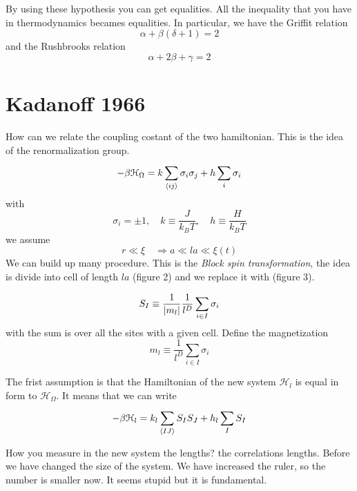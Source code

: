 \documentclass[../main/main.tex]{subfiles}
\begin{document}
By using these hypothesis you can get equalities. All the inequality that you have in thermodynamics becames equalities.
In particular, we have the Griffit relation
\begin{equation}
  \alpha + \beta (\delta +1) = 2
\end{equation}
and the Rushbrooks relation
\begin{equation}
  \alpha + 2 \beta + \gamma = 2
\end{equation}

\section{Kadanoff 1966}
How can we relate the coupling costant of the two hamiltonian. This is the idea of the renormalization group.
\begin{equation}
  - \beta \mathcal{H}_{\Omega } = k \sum_{\expval{ij} }^{} \sigma _i \sigma _j + h \sum_{i}^{} \sigma _i
\end{equation}
with
\begin{equation}
  \sigma _i = \pm 1, \quad k \equiv \frac{J}{k_B T}, \quad h \equiv \frac{H}{k_B T}
\end{equation}
we assume
\begin{equation}
  r \ll \xi  \quad \Rightarrow a \ll l a \ll \xi (t)
\end{equation}
We can build up many procedure.
This is the \emph{Block spin transformation}, the idea is divide into cell of length \( la \) (figure 2) and we replace it with (figure 3).

\begin{equation}
  S_I \equiv \frac{1}{\abs{m_l} } \frac{1}{l^D} \sum_{i \in I}^{}  \sigma _i
\end{equation}
with the sum is over all the sites with a given cell.
Define the magnetization
\begin{equation}
  m_l \equiv \frac{1}{l^D} \sum_{i \in I}^{} \sigma _i
\end{equation}

The frist assumption is that the Hamiltonian of the new system \( \mathcal{H}_l \) is equal in form to \( \mathcal{H}_ \Omega  \). It means that we can write
\begin{equation}
  - \beta \mathcal{H}_l = k_l \sum_{\expval{IJ} }^{} S_I S_J  + h_l \sum_{I}^{} S_I
\end{equation}

How you measure in the new system the lengths? the correlations lengths. Before we have changed the size of the system. We have increased the ruler, so the number is smaller now. It seems stupid but it is fundamental.
\end{document}
